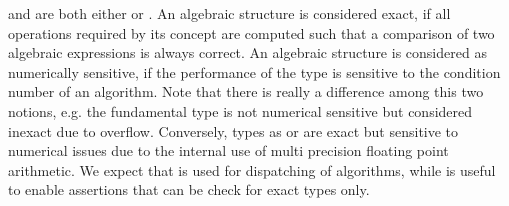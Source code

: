 and  are both either  or .
An algebraic structure is considered exact,
if all operations required by its concept are computed such that a comparison 
of two algebraic expressions is always correct.
An algebraic structure is  considered as numerically sensitive,
if the performance of the type is sensitive to the condition number of an algorithm.
Note that there is really a difference among this two notions, e.g. the fundamental type  
is not numerical sensitive but considered inexact due to overflow. 
Conversely, types as  or  are exact but sensitive 
to numerical issues due to the internal use of multi precision floating point arithmetic.
We expect that  is used for dispatching of algorithms, 
while  is useful to enable assertions that can be check for exact types only.



